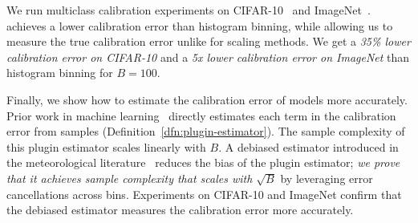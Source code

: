 We run multiclass calibration experiments on CIFAR-10~\cite{krizhevsky2009learningmultiple} and ImageNet~\cite{deng2009imagenet}.
\Ourcal{} achieves a lower calibration error than histogram binning, while allowing us to measure the true calibration error unlike for scaling methods.
We get a \emph{35\% lower calibration error on CIFAR-10} and a \emph{5x lower calibration error on ImageNet} than histogram binning for $B = 100$.

Finally, we show how to estimate the calibration error of models more accurately. Prior work in machine learning~\cite{nguyen2015posterior, guo2017calibration, hendrycks2019anomaly, kuleshov2015calibrated, hendrycks2019pretraining} directly estimates each term in the calibration error from samples (Definition~\ref{dfn:plugin-estimator}). The sample complexity of this plugin estimator scales linearly with $B$. A debiased estimator introduced in the meteorological literature~\cite{brocker2012empirical, ferro2012bias} reduces the bias of the plugin estimator; \emph{we prove that it achieves sample complexity that scales with $\sqrt{B}$} by leveraging error cancellations across bins. Experiments on CIFAR-10 and ImageNet confirm that the debiased estimator measures the calibration error more accurately.



